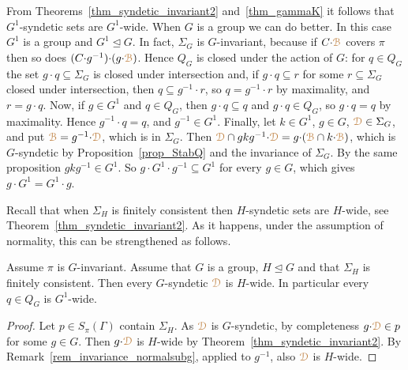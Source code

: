 From Theorems~\ref{thm_syndetic_invariant2} and~\ref{thm_gammaK} it follows that $G^1$-syndetic sets are $G^1$-wide.
When $G$ is a group we can do better.
In this case $G^1$ is a group and $G^1\trianglelefteq G$.
In fact, $\Sigma_G$ is $G$-invariant, because if $C{\cdot}{\color{brown}\EuScript B}$ covers $\pi$ then so does $(C{\cdot}g^{-1}){\cdot}(g{\cdot}{\color{brown}\EuScript B})$.
Hence $Q_G$ is closed under the action of $G$: for $q\in Q_G$ the set $g{\cdot}q\subseteq\Sigma_G$ is closed under intersection and, if $g{\cdot}q\subseteq r$ for some $r\subseteq\Sigma_G$ closed under intersection, then $q\subseteq g^{-1}{\cdot}r$, so $q=g^{-1}{\cdot}r$ by maximality, and $r=g{\cdot}q$.
Now, if $g\in G^1$ and $q\in Q_G$, then $g{\cdot}q\subseteq q$ and $g{\cdot}q\in Q_G$, so $g{\cdot}q=q$ by maximality.
Hence $g^{-1}{\cdot}q=q$, and $g^{-1}\in G^1$.
Finally, let $k\in G^1$, $g\in G$, ${\color{brown}\EuScript D}\in\Sigma_G$, and put ${\color{brown}\EuScript B}=g^{-1}{\cdot}{\color{brown}\EuScript D}$, which is in $\Sigma_G$.
Then ${\color{brown}\EuScript D}\cap gkg^{-1}{\cdot}{\color{brown}\EuScript D}=g{\cdot}({\color{brown}\EuScript B}\cap k{\cdot}{\color{brown}\EuScript B})$, which is $G$-syndetic by Proposition~\ref{prop_StabQ} and the invariance of $\Sigma_G$.
By the same proposition $gkg^{-1}\in G^1$.
So $g{\cdot}G^1{\cdot}g^{-1}\subseteq G^1$ for every $g\in G$, which gives $g{\cdot}G^1=G^1{\cdot}g$.

Recall that when $\Sigma_H$ is finitely consistent then $H$-syndetic sets are $H$-wide, see Theorem~\ref{thm_syndetic_invariant2}.
As it happens, under the assumption of normality, this can be strengthened as follows.

\begin{proposition}\label{prop_Gsyndetic_Hthick1}
  Assume $\pi$ is $G$-invariant.
  Assume that $G$ is a group, $H\trianglelefteq G$ and that $\Sigma_H$ is finitely consistent.
  Then every $G$-syndetic ${\color{brown}\EuScript D}$ is $H$-wide.
  In particular every $q\in Q_G$ is $G^1$-wide.
\end{proposition}

\begin{proof}
  Let $p\in S_\pi(\Gamma)$ contain $\Sigma_H$.
  As ${\color{brown}\EuScript D}$ is $G$-syndetic, by completeness $g{\cdot}{\color{brown}\EuScript D}\in p$ for some $g\in G$.
  Then $g{\cdot}{\color{brown}\EuScript D}$ is $H$-wide by Theorem~\ref{thm_syndetic_invariant2}.
  By Remark~\ref{rem_invariance_normalsubg}, applied to $g^{-1}$, also ${\color{brown}\EuScript D}$ is $H$-wide.
\end{proof}

